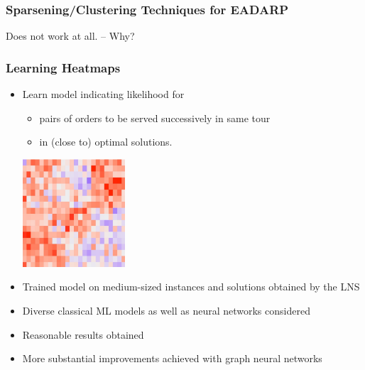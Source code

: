 \documentclass[aspectratio=1610]{beamer}
\newcommand{\important}[1]{{\color{green!60!black}#1}}
\begin{document}
\begin{frame}
	\frametitle{Sparsening/Clustering Techniques for EADARP}


	\bigskip
	\alert{Does not work at all.} -- Why? 

	\bigskip
\end{frame}

\begin{frame}
	\frametitle{Learning Heatmaps}

	\begin{itemize}
		\itemsep3ex
		\item Learn model indicating likelihood for
		\begin{itemize}
			\item pairs of orders to be served successively in same tour
			\item in (close to) optimal solutions.
		\end{itemize}
		\includegraphics[width=0.3\textwidth]{graphics/heatmap.jpg}
		\item Trained model on medium-sized instances and solutions obtained by the LNS
		\item Diverse classical ML models as well as neural networks considered
		\item<2> Reasonable results obtained
		\item<3> More substantial improvements achieved with \important{graph neural networks}
	\end{itemize}

\end{frame}
\end{document}
